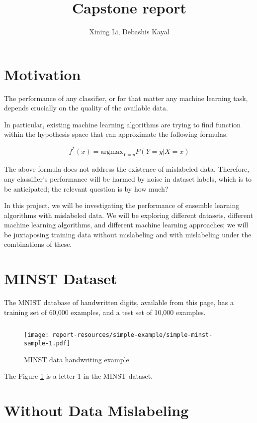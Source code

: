 \documentclass{article}
\author{Xining Li, Debashis Kayal}
\title {Capstone report}
\begin{document}
\maketitle

\section{Motivation}

The performance of any classifier, or for that matter any machine learning task, depends crucially on the quality of the available data. 


In particular, existing machine learning algorithms are trying to find function within the hypothesis space that can approximate the following formulas. 

\begin{equation}
    f^*(x) = {\mathrm {argmax}}_{Y=y} P (Y=y|X=x)
\end{equation}

The above formula does not address the existence of mislabeled data. Therefore, any classifier's performance will be harmed by noise in dataset labels, which is to be anticipated; the relevant question is by how much? 

In this project, we will be investigating the performance of ensemble learning algorithms with mislabeled data. We will be exploring different datasets, different machine learning algorithms, and different machine learning approaches; we will be juxtaposing training data without mislabeling and with mislabeling under the combinations of these. 

\section{MINST Dataset}

The MNIST database of handwritten digits, available from this page, has a training set of 60,000 examples, and a test set of 10,000 examples. 

\inputminted[firstline=16,lastline=18,frame=single,framesep=10pt]{python}{simple-example/main.py}

\begin{figure}[h!]
    \centering
    \texttt{[image: report-resources/simple-example/simple-minst-sample-1.pdf]}
    \caption{MINST data handwriting example}
    \label{fig:let1}
\end{figure}

The Figure \ref{fig:let1} is a letter 1 in the MINST dataset. 

\section{Without Data Mislabeling}
\end{document}
